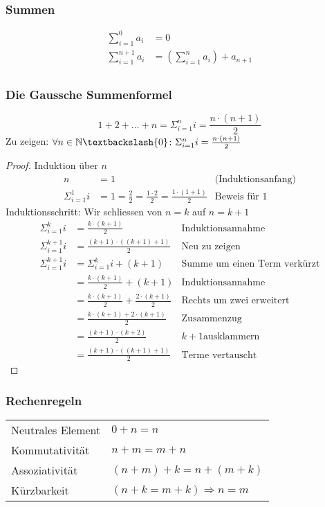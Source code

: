 \subsubsection{Summen}
\begin{align*}
	\sum_{i=1}^0 a_i& = 0\\
	\sum_{i=1}^{n+1} a_i& = \left( \sum_{i=1}^n a_i\right ) + a_{n+1}\\
\end{align*}

\subsubsection{Die Gaussche Summenformel}
\begin{equation*}
	1 + 2 + \dots + n = \Sigma_{i = 1}^{n} i = \frac{n \cdot (n+1)}{2}
\end{equation*}
Zu zeigen: $\forall n \in \N\textbackslash\{0\} \colon \Sigma_{i = 1}^n i = \frac{n \cdot (n + 1)}{2}$
\begin{proof}
	Induktion über $n$
	\begin{align*}
		n& = 1 &\mbox{(Induktionsanfang)}\\
		\Sigma_{i=1}^1 i & = 1 = \frac{2}{2} = \frac{1 \cdot 2}{2} = \frac{1 \cdot(1 + 1)}{2} &\mbox{Beweis für 1}
	\end{align*}
	Induktionsschritt: Wir schliessen von $n = k$ auf $n = k + 1$
	\begin{align*}
		\Sigma_{i=1}^k i& = \frac{k \cdot (k + 1)}{2} &\mbox{Induktionsannahme}\\
		\Sigma_{i=1}^{k+1} i& = \frac{(k + 1) \cdot ((k + 1) + 1)}{2} &\mbox{Neu zu zeigen}\\
		\Sigma_{i=1}^{k+1} i& = \Sigma_{i=1}^{k} i + (k + 1)&\mbox{Summe um einen Term verkürzt}\\
		& = \frac{k \cdot (k + 1)}{2} + (k + 1)& \mbox{Induktionsannahme}\\
		& = \frac{k \cdot (k + 1)}{2} + \frac{2 \cdot (k + 1)}{2} & \mbox{Rechts um zwei erweitert}\\
		& = \frac{k \cdot (k + 1) + 2 \cdot (k + 1)}{2}& \mbox{Zusammenzug}\\
		& = \frac{(k + 1) \cdot (k + 2)}{2} & k + 1 \mbox{ausklammern}\\
		& = \frac{(k + 1) \cdot ((k + 1) + 1)}{2} & \mbox{Terme vertauscht}
	\end{align*}
\end{proof}

\subsubsection{Rechenregeln}
\settowidth{\MyLenA}{Neutrales Element~~}
\begin{tabular}{@{}p{\the\MyLenA}%
				@{}p{}}
	Neutrales Element 		& $0 + n = n$\\
	Kommutativität			& $n + m = m + n$\\
	Assoziativität			& $(n + m) + k = n + (m + k)$\\
	Kürzbarkeit				& $(n + k = m + k) \Rightarrow n = m$\\
\end{tabular}

